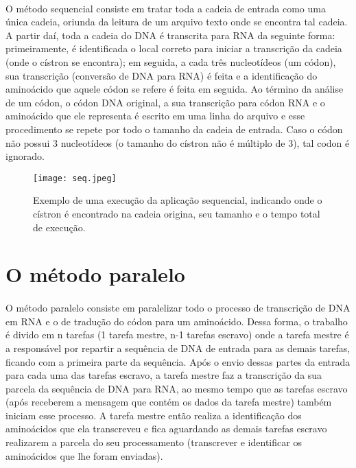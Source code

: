 \documentclass[a4paper,10pt]{article}
\begin{document}
\paragraph{}O método sequencial consiste em tratar toda a cadeia de entrada como uma única cadeia, oriunda da leitura de um arquivo texto onde se encontra tal cadeia. A partir daí, toda a cadeia do DNA é transcrita para RNA da seguinte forma: primeiramente, é identificada o local correto para iniciar a transcrição da cadeia (onde o cístron se encontra); em seguida, a cada três nucleotídeos (um códon), sua transcrição (conversão de DNA para RNA) é feita e a identificação do aminoácido que aquele códon se refere é feita em seguida. Ao término da análise de um códon, o códon DNA original, a sua transcrição para códon RNA e o aminoácido que ele representa é escrito em uma linha do arquivo e esse procedimento se repete por todo o tamanho da cadeia de entrada. Caso o códon não possui 3 nucleotídeos (o tamanho do cístron não é múltiplo de 3), tal codon é ignorado. 

\begin{figure}[!htb]
\texttt{[image: seq.jpeg]}
\caption{Exemplo de uma execução da aplicação sequencial, indicando onde o cístron é encontrado na cadeia origina, seu tamanho e o tempo total de execução.}
\label{arvore}
\end{figure}
\newpage


\section{O método paralelo}

\paragraph{}O método paralelo consiste em paralelizar todo o processo de transcrição de DNA em RNA e o de tradução do códon para um aminoácido. Dessa forma, o trabalho é divido em n tarefas (1 tarefa mestre, n-1 tarefas escravo) onde a tarefa mestre é a responsável por repartir a sequência de DNA de entrada para as demais tarefas, ficando com a primeira parte da sequência. Após o envio dessas partes da entrada para cada uma das tarefas escravo, a tarefa mestre faz a transcrição da sua parcela da sequência de DNA para RNA, ao mesmo tempo que as tarefas escravo (após receberem a mensagem que contém os dados da tarefa mestre) também iniciam esse processo. A tarefa mestre então realiza a identificação dos aminoácidos que ela transcreveu e fica aguardando as demais tarefas escravo realizarem a parcela do seu processamento (transcrever e identificar os aminoácidos que lhe foram enviadas).\\
\end{document}
